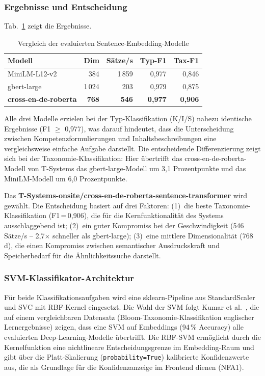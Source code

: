 \subsubsection{Ergebnisse und Entscheidung}\label{sec:modell-entscheidung}

Tab.~\ref{tab:modellvergleich} zeigt die Ergebnisse.

\begin{table}[H]
\caption{Vergleich der evaluierten Sentence-Embedding-Modelle\label{tab:modellvergleich}}
\centering
\small
\begin{tabular}{lrrrr}
\hline
\textbf{Modell} & \textbf{Dim} & \textbf{Sätze/s} & \textbf{Typ-F1} & \textbf{Tax-F1} \\
\hline
MiniLM-L12-v2 & 384 & 1\,859 & 0{,}977 & 0{,}846 \\
gbert-large & 1\,024 & 203 & 0{,}979 & 0{,}875 \\
\textbf{cross-en-de-roberta} & \textbf{768} & \textbf{546} & \textbf{0{,}977} & \textbf{0{,}906} \\
\hline
\end{tabular}
\end{table}

Alle drei Modelle erzielen bei der Typ-Klassifikation (K/I/S) nahezu identische Ergebnisse (F1 $\geq$ 0{,}977), was darauf hindeutet, dass die Unterscheidung zwischen Kompetenzformulierungen und Inhaltsbeschreibungen eine vergleichsweise einfache Aufgabe darstellt.
Die entscheidende Differenzierung zeigt sich bei der Taxonomie-Klassifikation: Hier übertrifft das cross-en-de-roberta-Modell von T-Systems das gbert-large-Modell um 3{,}1 Prozentpunkte und das MiniLM-Modell um 6{,}0 Prozentpunkte.

Das \textbf{T-Systems-onsite/cross-en-de-roberta-sentence-transformer} wird gewählt.
Die Entscheidung basiert auf drei Faktoren: (1)~die beste Taxonomie-Klassifikation (F1\,=\,0{,}906), die für die Kernfunktionalität des Systems ausschlaggebend ist; (2)~ein guter Kompromiss bei der Geschwindigkeit (546 Sätze/s -- 2{,}7$\times$ schneller als gbert-large); (3)~eine mittlere Dimensionalität (768\,d), die einen Kompromiss zwischen semantischer Ausdruckskraft und Speicherbedarf für die Ähnlichkeitssuche darstellt.

\subsubsection{SVM-Klassifikator-Architektur}\label{sec:svm-architektur}

Für beide Klassifikationsaufgaben wird eine sklearn-Pipeline aus StandardScaler und SVC mit RBF-Kernel eingesetzt.
Die Wahl der SVM folgt Kumar et al.~\cite{kumar2025automated}, die auf einem vergleichbaren Datensatz (Bloom-Taxonomie-Klassifikation englischer Lernergebnisse) zeigen, dass eine SVM auf Embeddings (94\,\% Accuracy) alle evaluierten Deep-Learning-Modelle übertrifft.
Die RBF-SVM ermöglicht durch die Kernelfunktion eine nichtlineare Entscheidungsgrenze im Embedding-Raum und gibt über die Platt-Skalierung (\texttt{probability=True}) kalibrierte Konfidenzwerte aus, die als Grundlage für die Konfidenzanzeige im Frontend dienen (NFA1).

